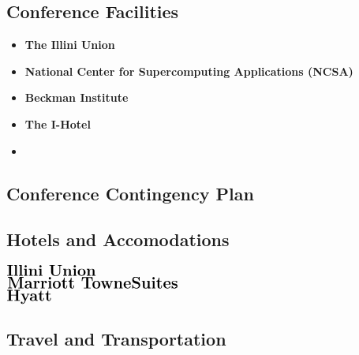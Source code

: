 \subsection{Conference Facilities}
\begin{itemize}
  \item \textbf{The Illini Union}\\
  \item \textbf{National Center for Supercomputing Applications (NCSA)}\\
  \item \textbf{Beckman Institute}\\
  \item \textbf{The I-Hotel}\\
  \item \textbf{}\\
\end{itemize}



\subsection{Conference Contingency Plan}
\subsection{Hotels and Accomodations}

$\Large\textbf{Illini Union}$\\

$\Large\textbf{Marriott TowneSuites}$\\

$\Large\textbf{Hyatt}$\\

\subsection{Travel and Transportation}

